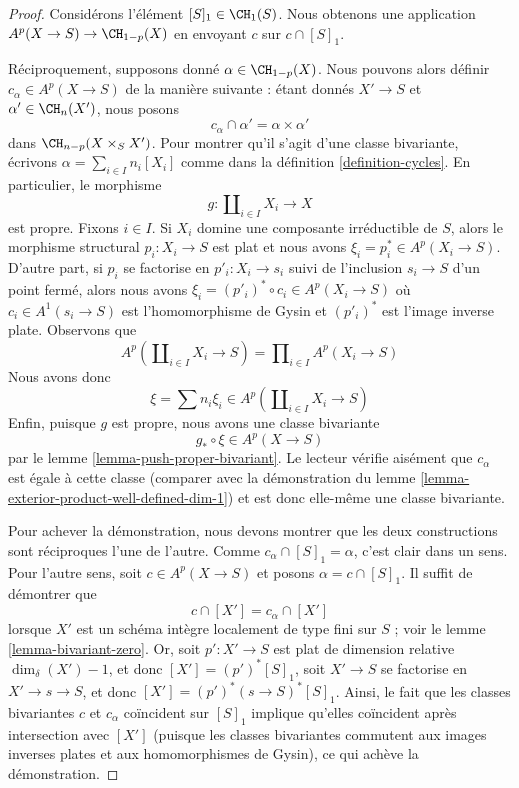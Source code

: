 \begin{proof}
Considérons l'élément $[S]_1 \in \CH_1(S)$. Nous obtenons une application
$A^p(X \to S) \to \CH_{1 - p}(X)$ en envoyant $c$ sur $c \cap [S]_1$.

\medskip\noindent
Réciproquement, supposons donné $\alpha \in \CH_{1 - p}(X)$.
Nous pouvons alors définir $c_\alpha \in A^p(X \to S)$ de la manière
suivante : étant donnés $X' \to S$ et $\alpha' \in \CH_n(X')$,
nous posons
$$
c_\alpha \cap \alpha' = \alpha \times \alpha'
$$
dans $\CH_{n - p}(X \times_S X')$. Pour montrer qu'il s'agit d'une classe
bivariante, écrivons $\alpha = \sum_{i \in I} n_i[X_i]$ comme dans la
définition \ref{definition-cycles}. En particulier, le morphisme
$$
g : \coprod\nolimits_{i \in I} X_i \longrightarrow X
$$
est propre. Fixons $i \in I$. Si $X_i$ domine une composante irréductible
de $S$, alors le morphisme structural $p_i : X_i \to S$ est plat et nous avons
$\xi_i = p_i^* \in A^p(X_i \to S)$. D'autre part, si $p_i$ se factorise
en $p'_i : X_i \to s_i$ suivi de l'inclusion $s_i \to S$
d'un point fermé, alors nous avons
$\xi_i = (p'_i)^* \circ c_i \in A^p(X_i \to S)$
où $c_i \in A^1(s_i \to S)$ est l'homomorphisme de Gysin et
$(p'_i)^*$ est l'image inverse plate. Observons que
$$
A^p(\coprod\nolimits_{i \in I} X_i \to S) =
\prod\nolimits_{i \in I} A^p(X_i \to S)
$$
Nous avons donc
$$
\xi = \sum n_i \xi_i \in A^p(\coprod\nolimits_{i \in I} X_i \to S)
$$
Enfin, puisque $g$ est propre, nous avons une classe bivariante
$$
g_* \circ \xi \in A^p(X \to S)
$$
par le lemme \ref{lemma-push-proper-bivariant}. Le lecteur vérifie aisément
que $c_\alpha$ est égale à cette classe
(comparer avec la démonstration du
lemme \ref{lemma-exterior-product-well-defined-dim-1})
et est donc elle-même une classe bivariante.

\medskip\noindent
Pour achever la démonstration, nous devons montrer que les deux constructions
sont réciproques l'une de l'autre. Comme $c_\alpha \cap [S]_1 = \alpha$,
c'est clair dans un sens. Pour l'autre sens, soit
$c \in A^p(X \to S)$ et posons $\alpha = c \cap [S]_1$.
Il suffit de démontrer que
$$
c \cap [X'] = c_\alpha \cap [X']
$$
lorsque $X'$ est un schéma intègre localement de type fini sur $S$ ;
voir le lemme \ref{lemma-bivariant-zero}. Or, soit $p' : X' \to S$
est plat de dimension relative $\dim_\delta(X') - 1$, et donc
$[X'] = (p')^*[S]_1$, soit $X' \to S$ se factorise en $X' \to s \to S$,
et donc $[X'] = (p')^*(s \to S)^*[S]_1$. Ainsi, le fait que les
classes bivariantes $c$ et $c_\alpha$ coïncident sur $[S]_1$
implique qu'elles coïncident après intersection avec $[X']$ (puisque les classes bivariantes
commutent aux images inverses plates et aux homomorphismes de Gysin), ce qui achève la démonstration.
\end{proof}

